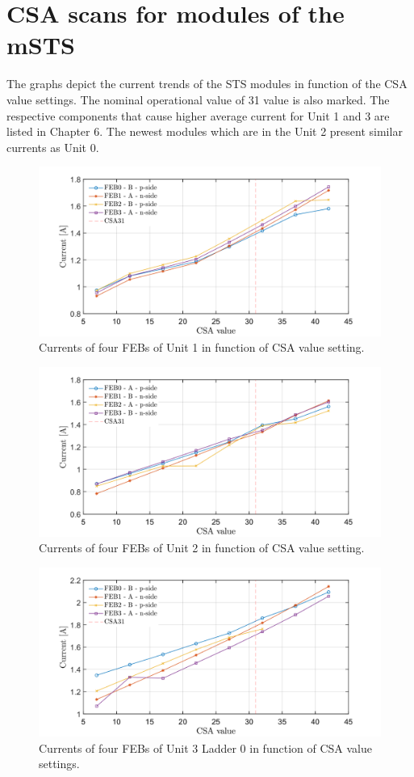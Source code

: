 \chapter{CSA scans for modules of the mSTS}
\label{CSA}
The graphs depict the current trends of the \gls{STS} modules in function of the CSA value settings. The nominal operational value of 31 value is also marked. The respective components that cause higher average current for Unit 1 and 3 are listed in Chapter 6. The newest modules which are in the Unit 2 present similar currents as Unit 0. 
\vfill
\begin{figure}[h!]
\centering
\includegraphics[width=0.9\columnwidth]{Chapter6/DCS/images/U1CSABIAS.png}
\caption{Currents of four \glspl{FEB} of Unit 1 in function of CSA value setting.}
\label{U1CSABIAS}
\end{figure}
\vfill
\begin{figure}
\centering
\includegraphics[width=0.9\columnwidth]{Chapter6/DCS/images/U2CSABIAS.png}
\caption{Currents of four \glspl{FEB} of Unit 2 in function of CSA value setting.}
\label{U2CSABIAS}
\end{figure}

\begin{figure}[h!]
\centering
\includegraphics[width=0.9\columnwidth]{Chapter6/DCS/images/U3L1CSABIAS.png}
\caption{Currents of four \glspl{FEB} of Unit 3 Ladder 0 in function of CSA value settings.}
\label{U3L1CSABIAS}
\end{figure}

